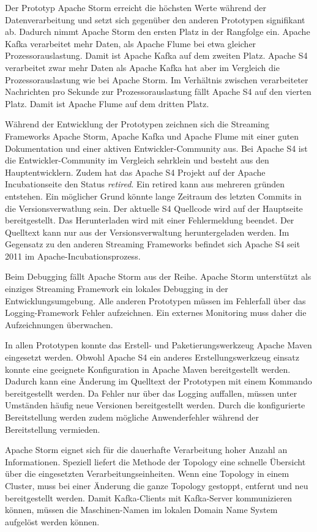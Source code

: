 Der Prototyp Apache Storm erreicht die höchsten Werte während der Datenverarbeitung und setzt sich gegenüber den anderen Prototypen signifikant ab. Dadurch nimmt Apache Storm den ersten Platz in der Rangfolge ein. Apache Kafka verarbeitet mehr Daten, als Apache Flume bei etwa gleicher Prozessorauslastung. Damit ist Apache Kafka auf dem zweiten Platz. Apache S4 verarbeitet zwar mehr Daten als Apache Kafka hat aber im Vergleich die Prozessorauslastung wie bei Apache Storm. Im Verhältnis zwischen verarbeiteter Nachrichten pro Sekunde zur Prozessorauslastung fällt Apache S4 auf den vierten Platz. Damit ist Apache Flume auf dem dritten Platz.

Während der Entwicklung der Prototypen zeichnen sich die Streaming Frameworks Apache Storm, Apache Kafka und Apache Flume mit einer guten Dokumentation und einer aktiven Entwickler-Community aus. Bei Apache S4 ist die Entwickler-Community im Vergleich sehrklein und besteht aus den Hauptentwicklern. Zudem hat das Apache S4 Projekt auf der Apache Incubationseite den Status \textit{retired}. Ein retired kann aus mehreren gründen entstehen. Ein möglicher Grund könnte lange Zeitraum des letzten Commits in die Versionsverwatlung sein. Der aktuelle S4 Quellcode wird auf der Hauptseite bereitgestellt. Das Herunterladen wird mit einer Fehlermeldung beendet. Der Quelltext kann nur aus der Versionsverwaltung heruntergeladen werden. Im Gegensatz zu den anderen Streaming Frameworks befindet sich Apache S4 seit 2011 im Apache-Incubationsprozess.

Beim Debugging fällt Apache Storm aus der Reihe. Apache Storm unterstützt als einziges Streaming Framework ein lokales Debugging in der Entwicklungsumgebung. Alle anderen Prototypen müssen im Fehlerfall über das Logging-Framework Fehler aufzeichnen. Ein externes Monitoring muss daher die Aufzeichnungen überwachen.

In allen Prototypen konnte das Erstell- und Paketierungswerkzeug Apache Maven eingesetzt werden. Obwohl Apache S4 ein anderes Erstellungswerkzeug einsatz konnte eine geeignete Konfiguration in Apache Maven bereitgestellt werden. Dadurch kann eine Änderung im Quelltext der Prototypen mit einem Kommando bereitgestellt werden. Da Fehler nur über das Logging auffallen, müssen unter Umständen häufig neue Versionen bereitgestellt werden. Durch die konfigurierte Bereitstellung werden zudem mögliche Anwenderfehler während der Bereitstellung vermieden.

Apache Storm eignet sich für die dauerhafte Verarbeitung hoher Anzahl an Informationen. Speziell liefert die Methode der Topology eine schnelle Übersicht über die eingesetzten Verarbeitungseinheiten. Wenn eine Topology in einem Cluster, muss bei einer Änderung die ganze Topology gestoppt, entfernt und neu bereitgestellt werden. Damit Kafka-Clients mit Kafka-Server kommunizieren können, müssen die Maschinen-Namen im lokalen Domain Name System aufgelöst werden können.


